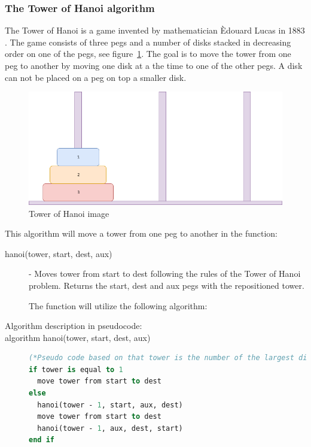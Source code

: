\documentclass {article}
\begin{document}
\subsubsection{The Tower of Hanoi algorithm}
\label{sec:hanoi}
The Tower of Hanoi is a game invented by mathematician \`{E}douard Lucas in 1883 \cite{hanoi}. The game consists of three pegs and a number of disks stacked in decreasing order on one of the pegs, see figure~\ref{fig:tower-of-hanoi-example}. The goal is to move the tower from one peg to another by moving one disk at a the time to one of the other pegs. A disk can not be placed on a peg on top a smaller disk. 
 
\begin{figure}[H]
\includegraphics[width=\textwidth]{tower-of-hanoi-example}

\caption{Tower of Hanoi image}
\label{fig:tower-of-hanoi-example}
\end{figure}
 
This algorithm will move a tower from one peg to another in the function:
 
\begin{description}
\item[hanoi(tower, start, dest, aux)] - Moves tower from start to dest following the rules of the Tower of Hanoi problem. Returns the start, dest and aux pegs with the repositioned tower.


The function will utilize the following algorithm:
\item[Algorithm description in pseudocode:]
\item[algorithm hanoi(tower, start, dest, aux)]
\item[] 
\begin{lstlisting}[language=Pascal]
(*Pseudo code based on that tower is the number of the largest disk, where 1 is the smallest disk in the tower.*)
if tower is equal to 1
  move tower from start to dest
else
  hanoi(tower - 1, start, aux, dest)
  move tower from start to dest
  hanoi(tower - 1, aux, dest, start)
end if
\end{lstlisting}
\end{description}
\end{document}
